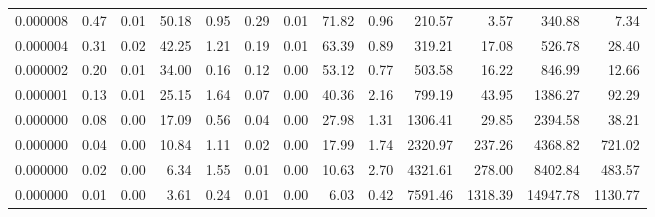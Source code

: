 \begin{tabular}{lrrrrrrrrrrrr}
0.000008 & 0.47 & 0.01 & 50.18 & 0.95 & 0.29 & 0.01 & 71.82 & 0.96 & 210.57 & 3.57 & 340.88 & 7.34 \\
0.000004 & 0.31 & 0.02 & 42.25 & 1.21 & 0.19 & 0.01 & 63.39 & 0.89 & 319.21 & 17.08 & 526.78 & 28.40 \\
0.000002 & 0.20 & 0.01 & 34.00 & 0.16 & 0.12 & 0.00 & 53.12 & 0.77 & 503.58 & 16.22 & 846.99 & 12.66 \\
0.000001 & 0.13 & 0.01 & 25.15 & 1.64 & 0.07 & 0.00 & 40.36 & 2.16 & 799.19 & 43.95 & 1386.27 & 92.29 \\
0.000000 & 0.08 & 0.00 & 17.09 & 0.56 & 0.04 & 0.00 & 27.98 & 1.31 & 1306.41 & 29.85 & 2394.58 & 38.21 \\
0.000000 & 0.04 & 0.00 & 10.84 & 1.11 & 0.02 & 0.00 & 17.99 & 1.74 & 2320.97 & 237.26 & 4368.82 & 721.02 \\
0.000000 & 0.02 & 0.00 & 6.34 & 1.55 & 0.01 & 0.00 & 10.63 & 2.70 & 4321.61 & 278.00 & 8402.84 & 483.57 \\
0.000000 & 0.01 & 0.00 & 3.61 & 0.24 & 0.01 & 0.00 & 6.03 & 0.42 & 7591.46 & 1318.39 & 14947.78 & 1130.77 \\
\bottomrule
\end{tabular}
